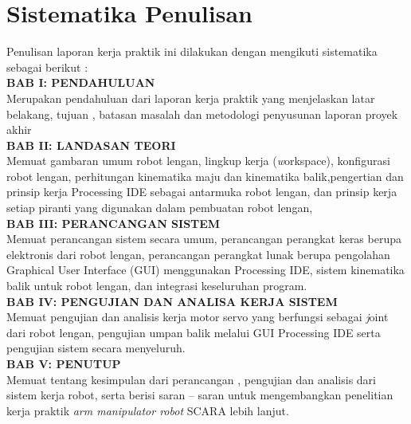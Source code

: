\section{Sistematika Penulisan}
Penulisan laporan kerja praktik ini dilakukan dengan mengikuti sistematika sebagai berikut :\\
\noindent
\textbf{BAB I\hspace*{0.6cm}: PENDAHULUAN}\\
\noindent
Merupakan pendahuluan dari laporan kerja praktik yang menjelaskan latar belakang, tujuan , batasan masalah dan metodologi penyusunan laporan proyek akhir\\
\noindent
\textbf{BAB II\hspace*{0.5cm}: LANDASAN TEORI}\\
\noindent
Memuat gambaran umum robot lengan, lingkup kerja (\emph workspace), konfigurasi robot lengan, perhitungan kinematika maju dan kinematika balik,pengertian dan prinsip kerja Processing IDE sebagai antarmuka robot lengan, dan prinsip kerja setiap piranti yang digunakan dalam pembuatan robot lengan, \\
\textbf{BAB III\hspace*{0.375cm}:  PERANCANGAN SISTEM}\\
\noindent
Memuat perancangan sistem secara umum, perancangan perangkat keras berupa elektronis dari robot lengan, perancangan perangkat lunak berupa pengolahan Graphical User Interface (GUI) menggunakan Processing IDE, sistem kinematika balik untuk robot lengan, dan integrasi keseluruhan program. \\
\textbf{BAB IV\hspace*{0.4cm}:  PENGUJIAN DAN ANALISA KERJA SISTEM }\\
\noindent
Memuat pengujian dan analisis kerja motor servo yang berfungsi sebagai \emph joint dari robot lengan, pengujian umpan balik melalui GUI Processing IDE serta pengujian sistem secara menyeluruh.\\
\textbf{BAB V\hspace*{0.6cm}: PENUTUP}\\
Memuat tentang kesimpulan dari perancangan , pengujian dan analisis dari sistem kerja robot, serta berisi saran – saran untuk mengembangkan penelitian kerja praktik \emph{ arm manipulator robot} SCARA lebih lanjut. \\
